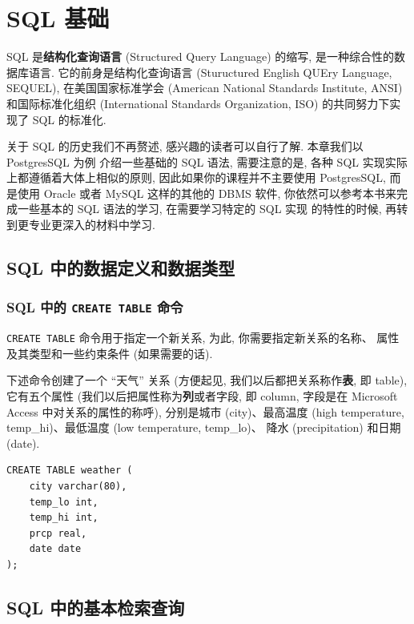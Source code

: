 \documentclass[10pt,UTF8]{book} %
\begin{document}
\newpage
\thispagestyle{empty}

\chapter{SQL 基础}

SQL 是\textbf{结构化查询语言} (Structured Query Language) 的缩写,
是一种综合性的数据库语言.
它的前身是结构化查询语言 (Stuructured English QUEry Language, SEQUEL),
在美国国家标准学会 (American National Standards Institute, ANSI) 和国际标准化组织
(International Standards Organization, ISO) 的共同努力下实现了 SQL 的标准化.

关于 SQL 的历史我们不再赘述, 感兴趣的读者可以自行了解. 本章我们以 PostgresSQL 为例
介绍一些基础的 SQL 语法, 需要注意的是, 各种 SQL 实现实际上都遵循着大体上相似的原则,
因此如果你的课程并不主要使用 PostgresSQL, 而是使用 Oracle 或者 MySQL 这样的其他的
DBMS 软件, 你依然可以参考本书来完成一些基本的 SQL 语法的学习, 在需要学习特定的 SQL 实现
的特性的时候, 再转到更专业更深入的材料中学习.

\section{SQL 中的数据定义和数据类型}

\subsection{SQL 中的 \lstinline|CREATE TABLE| 命令}

\lstinline|CREATE TABLE| 命令用于指定一个新关系, 为此, 你需要指定新关系的名称、
属性及其类型和一些约束条件 (如果需要的话).

\begin{example} 
    下述命令创建了一个 “天气” 关系 (方便起见, 我们以后都把关系称作\textbf{表}, 即 table),
    它有五个属性 (我们以后把属性称为\textbf{列}或者字段, 即 column, 字段是在
    Microsoft Access 中对关系的属性的称呼), 分别是城市 (city)、最高温度 (high temperature, temp\_hi)、最低温度 (low temperature, temp\_lo)、
    降水 (precipitation) 和日期 (date).
\begin{lstlisting}
CREATE TABLE weather (
    city varchar(80),
    temp_lo int,
    temp_hi int,
    prcp real,
    date date
);
\end{lstlisting}
\end{example}

\section{SQL 中的基本检索查询}
\end{document}
